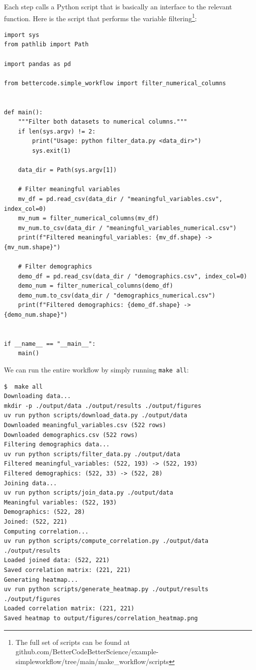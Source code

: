 Each step calls a Python script that is basically an interface to the relevant function. Here is the script that performs the variable filtering\footnote{The full set of scripts can be found at github.com/BetterCodeBetterScience/example-simpleworkflow/tree/main/make\_workflow/scripts}:

\begin{lstlisting}[style=python]
import sys
from pathlib import Path

import pandas as pd

from bettercode.simple_workflow import filter_numerical_columns


def main():
    """Filter both datasets to numerical columns."""
    if len(sys.argv) != 2:
        print("Usage: python filter_data.py <data_dir>")
        sys.exit(1)

    data_dir = Path(sys.argv[1])

    # Filter meaningful variables
    mv_df = pd.read_csv(data_dir / "meaningful_variables.csv", index_col=0)
    mv_num = filter_numerical_columns(mv_df)
    mv_num.to_csv(data_dir / "meaningful_variables_numerical.csv")
    print(f"Filtered meaningful_variables: {mv_df.shape} -> {mv_num.shape}")

    # Filter demographics
    demo_df = pd.read_csv(data_dir / "demographics.csv", index_col=0)
    demo_num = filter_numerical_columns(demo_df)
    demo_num.to_csv(data_dir / "demographics_numerical.csv")
    print(f"Filtered demographics: {demo_df.shape} -> {demo_num.shape}")


if __name__ == "__main__":
    main()
\end{lstlisting}

We can run the entire workflow by simply running \texttt{make all}:

\begin{lstlisting}[style=shell]
$  make all
Downloading data...
mkdir -p ./output/data ./output/results ./output/figures
uv run python scripts/download_data.py ./output/data
Downloaded meaningful_variables.csv (522 rows)
Downloaded demographics.csv (522 rows)
Filtering demographics data...
uv run python scripts/filter_data.py ./output/data
Filtered meaningful_variables: (522, 193) -> (522, 193)
Filtered demographics: (522, 33) -> (522, 28)
Joining data...
uv run python scripts/join_data.py ./output/data
Meaningful variables: (522, 193)
Demographics: (522, 28)
Joined: (522, 221)
Computing correlation...
uv run python scripts/compute_correlation.py ./output/data ./output/results
Loaded joined data: (522, 221)
Saved correlation matrix: (221, 221)
Generating heatmap...
uv run python scripts/generate_heatmap.py ./output/results ./output/figures
Loaded correlation matrix: (221, 221)
Saved heatmap to output/figures/correlation_heatmap.png
\end{lstlisting}

